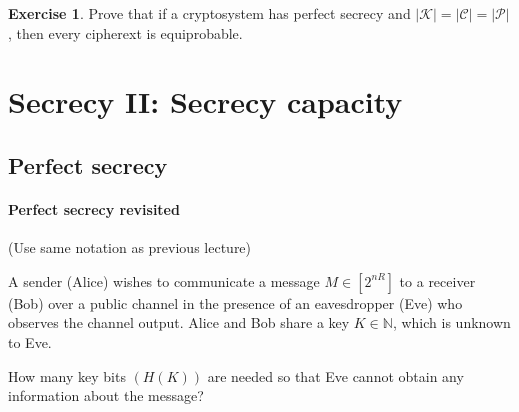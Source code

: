 \documentclass[a4paper, 11pt, openany]{book}
\numberwithin{equation}{section}
\theoremstyle{plain}
\theoremstyle{definition}
\newtheorem{exercise}   {Exercise}  [section]
\newcommand{\alphabet}[1]{\mathcal{#1}}
\begin{document}
\begin{exercise}
Prove that if a cryptosystem has perfect secrecy and $|\alphabet{K}| = |\alphabet{C}| = |\alphabet{P}|$, then every cipherext is equiprobable.
\end{exercise}









\section{Secrecy II: Secrecy capacity}
\label{sec:40}





\subsection{Perfect secrecy}

\paragraph{Perfect secrecy revisited}
(Use same notation as previous lecture)

A sender (Alice) wishes to communicate a message $M \in [2^{nR}]$ to a receiver
(Bob) over a public channel in the presence of an eavesdropper (Eve) who
observes the channel output. Alice and Bob share a key $K \in \mathbb{N}$, which is
unknown to Eve. 

How many key bits $(H(K))$ are needed so that Eve cannot obtain any information about the message?

\begin{center}
\end{center}
\end{document}
